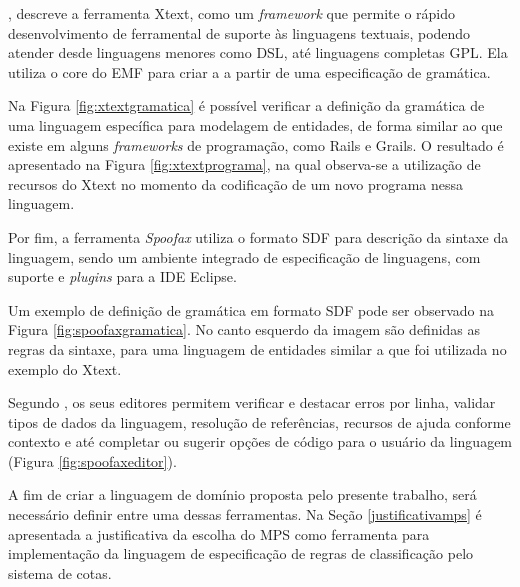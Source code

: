, descreve a ferramenta Xtext, como um \textit{framework} que permite o rápido desenvolvimento de ferramental de suporte às linguagens textuais, podendo atender desde linguagens menores como \gls{DSL}, até linguagens completas \gls{GPL}. Ela utiliza o core do \gls{EMF} para criar a  a partir de uma especificação de gramática. 

Na Figura \ref{fig:xtextgramatica} é possível verificar a definição da gramática de uma linguagem específica para modelagem de entidades, de forma similar ao que existe em alguns \textit{frameworks} de programação, como Rails e Grails. O resultado é apresentado na Figura \ref{fig:xtextprograma}, na qual observa-se a utilização de recursos do Xtext no momento da codificação de um novo programa nessa linguagem.





\newpage
Por fim, a ferramenta \textit{Spoofax} utiliza o formato \gls{SDF} para descrição da sintaxe da linguagem, sendo um ambiente integrado de especificação de linguagens, com suporte e \textit{plugins} para a \gls{IDE} Eclipse. 

Um exemplo de definição de gramática em formato \gls{SDF} pode ser observado na Figura \ref{fig:spoofaxgramatica}. No canto esquerdo da imagem são definidas as regras da sintaxe, para uma linguagem de entidades similar a que foi utilizada no exemplo do Xtext. 




Segundo , os seus editores permitem verificar e destacar erros por linha, validar tipos de dados da linguagem, resolução de referências, recursos de ajuda conforme contexto e até completar ou sugerir opções de código para o usuário da linguagem (Figura \ref{fig:spoofaxeditor}). 



A fim de criar a linguagem de domínio proposta pelo presente trabalho, será necessário definir entre uma dessas ferramentas. Na Seção \ref{justificativamps} é apresentada a justificativa da escolha do \gls{MPS} como ferramenta para implementação da linguagem de especificação de regras de classificação pelo sistema de cotas.